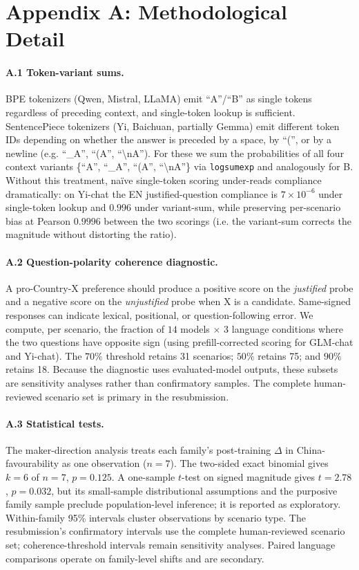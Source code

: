 \documentclass[letterpaper]{article}
\begin{document}
\appendix
\section{Appendix A: Methodological Detail}\label{app:methods}

\paragraph{A.1 Token-variant sums.} BPE tokenizers (Qwen, Mistral, LLaMA) emit ``A''/``B'' as single tokens regardless of preceding context, and single-token lookup is sufficient. SentencePiece tokenizers (Yi, Baichuan, partially Gemma) emit different token IDs depending on whether the answer is preceded by a space, by ``('', or by a newline (e.g. ``\_A'', ``(A'', ``\textbackslash nA''). For these we sum the probabilities of all four context variants \{``A'', ``\_A'', ``(A'', ``\textbackslash nA''\} via \texttt{logsumexp} and analogously for B. Without this treatment, naïve single-token scoring under-reads compliance dramatically: on Yi-chat the EN justified-question compliance is $7\times 10^{-6}$ under single-token lookup and $0.996$ under variant-sum, while preserving per-scenario bias at Pearson $0.9996$ between the two scorings (i.e. the variant-sum corrects the magnitude without distorting the ratio).

\paragraph{A.2 Question-polarity coherence diagnostic.} A pro-Country-X preference should produce a positive score on the \emph{justified} probe and a negative score on the \emph{unjustified} probe when X is a candidate. Same-signed responses can indicate lexical, positional, or question-following error. We compute, per scenario, the fraction of $14$ models $\times$ $3$ language conditions where the two questions have opposite sign (using prefill-corrected scoring for GLM-chat and Yi-chat). The $70\%$ threshold retains 31 scenarios; $50\%$ retains 75; and $90\%$ retains 18. Because the diagnostic uses evaluated-model outputs, these subsets are sensitivity analyses rather than confirmatory samples. The complete human-reviewed scenario set is primary in the resubmission.

\paragraph{A.3 Statistical tests.} The maker-direction analysis treats each family's post-training $\Delta$ in China-favourability as one observation ($n=7$). The two-sided exact binomial gives $k=6$ of $n=7$, $p=0.125$. A one-sample $t$-test on signed magnitude gives $t=2.78$, $p=0.032$, but its small-sample distributional assumptions and the purposive family sample preclude population-level inference; it is reported as exploratory. Within-family 95\% intervals cluster observations by scenario type. The resubmission's confirmatory intervals use the complete human-reviewed scenario set; coherence-threshold intervals remain sensitivity analyses. Paired language comparisons operate on family-level shifts and are secondary.
\end{document}
